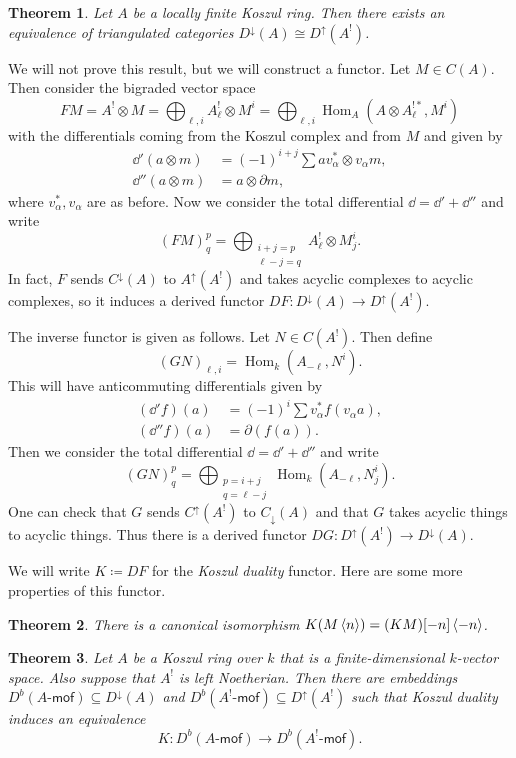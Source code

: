 \documentclass[leqno, openany]{memoir}
\newtheorem{thm}{Theorem}[section]
\theoremstyle{definition}
\theoremstyle{remark}
\theoremstyle{plain}
\theoremstyle{definition}
\theoremstyle{remark}
\newcommand{\ms}[1]{\mathsf{#1}}
\DeclareMathOperator{\Hom}{Hom}
\begin{document}
\begin{thm}
    Let $A$ be a locally finite Koszul ring. Then there exists an equivalence of triangulated categories $D^{\downarrow}(A) \cong D^{\uparrow}(A^!)$.
\end{thm}

We will not prove this result, but we will construct a functor. Let $M \in C(A)$. Then consider the bigraded vector space
\[ FM = A^! \otimes M = \bigoplus_{\ell,i} A_{\ell}^! \otimes M^i = \bigoplus_{\ell,i} \Hom_A(A \otimes A_{\ell}^{!*}, M^i) \]
with the differentials coming from the Koszul complex and from $M$ and given by
\begin{align*}
    \dd'(a \otimes m) &= (-1)^{i+j} \sum a v_{\alpha}^* \otimes v_{\alpha} m, \\
    \dd''(a \otimes m) &= a \otimes \partial m,
\end{align*}
where $v_{\alpha}^*, v_{\alpha}$ are as before. Now we consider the total differential $\dd = \dd' + \dd''$ and write
\[ (FM)_q^p = \bigoplus_{\substack{i+j=p \\ \ell-j = q}} A_{\ell}^! \otimes M_j^i. \]
In fact, $F$ sends $C^{\downarrow}(A)$ to $A^{\uparrow}(A^!)$ and takes acyclic complexes to acyclic complexes, so it induces a derived functor $DF \colon D^{\downarrow}(A) \to D^{\uparrow}(A^!)$. 

The inverse functor is given as follows. Let $N \in C(A^!)$. Then define
\[ (GN)_{\ell,i} = \Hom_k(A_{-\ell}, N^i). \]
This will have anticommuting differentials given by
\begin{align*}
    (\dd' f)(a) &= (-1)^i \sum v_{\alpha}^* f(v_{\alpha} a), \\
    (\dd'' f)(a) &= \partial(f(a)).
\end{align*}
Then we consider the total differential $\dd = \dd' + \dd''$ and write
\[ (GN)_q^p = \bigoplus_{\substack{p=i+j\\ q=\ell-j}} \Hom_k(A_{-\ell}, N_j^i). \]
One can check that $G$ sends $C^{\uparrow}(A^!)$ to $C_{\downarrow}(A)$ and that $G$ takes acyclic things to acyclic things. Thus there is a derived functor $DG \colon D^{\uparrow}(A^!) \to D^{\downarrow}(A)$.

We will write $K \coloneqq DF$ for the \textit{Koszul duality} functor. Here are some more properties of this functor.
\begin{thm}
    There is a canonical isomorphism $K(M\ev{n}) = (KM)[-n]\ev{-n}$.
\end{thm}

\begin{thm}
    Let $A$ be a Koszul ring over $k$ that is a finite-dimensional $k$-vector space. Also suppose that $A^!$ is left Noetherian. Then there are embeddings $D^b(A\text{-}\ms{mof}) \subseteq D^{\downarrow}(A)$ and $D^b(A^!\text{-}\ms{mof}) \subseteq D^{\uparrow}(A^!)$ such that Koszul duality induces an equivalence
    \[ K \colon D^b(A\text{-}\ms{mof}) \to D^b(A^!\text{-}\ms{mof}). \]
\end{thm}
\end{document}
